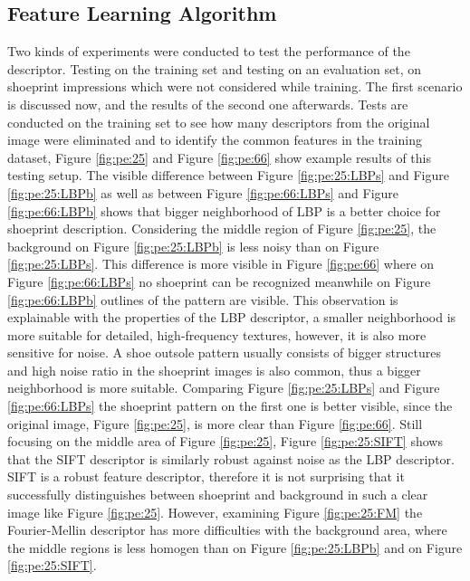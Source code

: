 \documentclass[draft,final]{vutinfth} %
\begin{document}
\subsection{Feature Learning Algorithm}
\par
Two kinds of experiments were conducted to test the performance of the descriptor.
Testing on the training set and testing on an evaluation set, on shoeprint impressions which were not considered while training.
The first scenario is discussed now, and the results of the second one afterwards.
Tests are conducted on the training set to see how many descriptors from the original image were eliminated and to identify the common features in the training dataset, Figure \ref{fig:pe:25} and Figure \ref{fig:pe:66} show example results of this testing setup.
The visible difference between Figure \ref{fig:pe:25:LBPs} and Figure \ref{fig:pe:25:LBPb} as well as between Figure \ref{fig:pe:66:LBPs} and Figure \ref{fig:pe:66:LBPb} shows that bigger neighborhood of LBP is a better choice for shoeprint description.
Considering the middle region of Figure \ref{fig:pe:25}, the background on Figure \ref{fig:pe:25:LBPb} is less noisy than on Figure \ref{fig:pe:25:LBPs}.
This difference is more visible in  Figure \ref{fig:pe:66} where on Figure \ref{fig:pe:66:LBPs} no shoeprint can be recognized meanwhile on Figure \ref{fig:pe:66:LBPb} outlines of the pattern are visible.
This observation is explainable with the properties of the LBP descriptor, a smaller neighborhood is more suitable for detailed, high-frequency textures, however, it is also more sensitive for noise.
A shoe outsole pattern usually consists of bigger structures and high noise ratio in the shoeprint images is also common, thus a bigger neighborhood is more suitable.
Comparing Figure \ref{fig:pe:25:LBPs} and Figure \ref{fig:pe:66:LBPs} the shoeprint pattern on the first one is better visible, since the original image, Figure \ref{fig:pe:25}, is more clear than Figure \ref{fig:pe:66}.
Still focusing on the middle area of Figure \ref{fig:pe:25}, Figure \ref{fig:pe:25:SIFT} shows that the SIFT descriptor is similarly robust against noise as the LBP descriptor.
SIFT is a robust feature descriptor, therefore it is not surprising that it successfully distinguishes between shoeprint and background in such a clear image like Figure \ref{fig:pe:25}.
However, examining Figure  \ref{fig:pe:25:FM} the Fourier-Mellin descriptor has more difficulties with the background area, where the middle regions is less homogen than on  Figure \ref{fig:pe:25:LBPb} and on Figure \ref{fig:pe:25:SIFT}.
\end{document}
